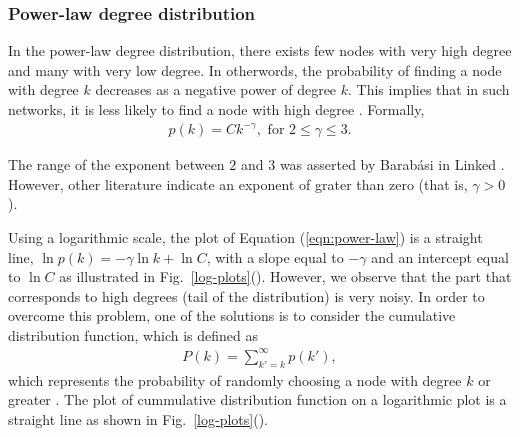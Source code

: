 \documentclass[10pt,a4paper]{article}
\theoremstyle{plain}
\theoremstyle{definition}
\begin{document}
\subsubsection{Power-law degree distribution}
In the power-law degree distribution, there exists few nodes with very high degree and many with very low degree. In otherwords, the probability of finding a node with degree $k$ decreases as a negative power of degree $k$. This implies that in such networks, it is less likely to find a node with high degree \citep{estrada2011structure}.
Formally,
\begin{eqnarray}
p(k) = C k^{-\gamma}, \text{ for } 2 \leq \gamma  \leq 3.
\label{eqn:power-law}
\end{eqnarray}

The range of the exponent between $2$ and $3$ was asserted by Barab\'{a}si in Linked \citep{barabasi2003linked}. However, other literature indicate an exponent of grater than zero (that is, $\gamma > 0$).

Using a logarithmic scale, the plot of Equation (\ref{eqn:power-law}) is a straight line, $\ln p(k) = -\gamma \ln k + \ln C $, with a slope equal to $-\gamma $ and an intercept equal to $\ln C$ as illustrated in Fig.~\ref{log-plots}(). However, we observe that the part that corresponds to high degrees (tail of the distribution) is very noisy. In order to overcome this problem, one of the solutions is to consider the cumulative distribution function, which is defined as 
\begin{eqnarray*}
	P(k) = \sum_{k'=k}^\infty p(k'),
\end{eqnarray*}
which represents the probability of randomly choosing a node with degree $k$ or greater \citep{estrada2011structure}. The plot of cummulative distribution function on a logarithmic plot is a straight line as shown in Fig.~\ref{log-plots}().
\end{document}
